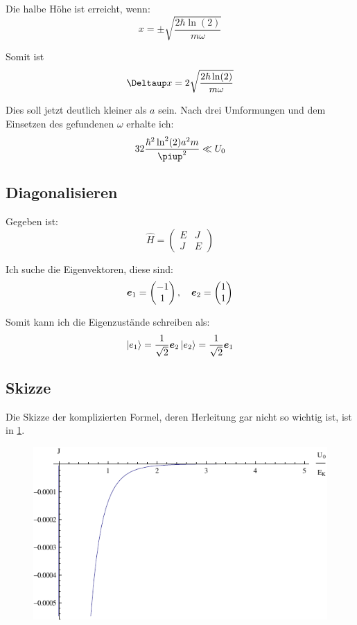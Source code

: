 Die halbe Höhe ist erreicht, wenn:
\[
	x = \pm \sqrt{\frac{2\hbar \ln(2)}{m\omega}}
\]

Somit ist
\[
	\Deltaup x = 2 \sqrt{\frac{2\hbar \ln(2)}{m\omega}}
\]

Dies soll jetzt deutlich kleiner als $a$ sein. Nach drei Umformungen und dem
Einsetzen des gefundenen $\omega$ erhalte ich:
\[
	32 \frac{\hbar^2 \ln^2(2) a^2 m}{\piup^2} \ll U_0
\]

\subsection{Diagonalisieren}

Gegeben ist:
\[
	\hat H = \begin{pmatrix}
		E & J \\ J & E
	\end{pmatrix}
\]

Ich suche die Eigenvektoren, diese sind:
\[
	\boldsymbol{e}_1 = \begin{pmatrix}
		-1 \\ 1
	\end{pmatrix}
	,\quad
	\boldsymbol{e}_2 = \begin{pmatrix}
		1 \\ 1
	\end{pmatrix}
\]

Somit kann ich die Eigenzustände schreiben als:
\[
	\left| e_1 \right\rangle = \frac{1}{\sqrt{2}} \boldsymbol{e}_2 \\
	\left| e_2 \right\rangle = \frac{1}{\sqrt{2}} \boldsymbol{e}_1 \\
\]

\subsection{Skizze}

Die Skizze der komplizierten Formel, deren Herleitung gar nicht so wichtig ist,
ist in \cref{fig:J}.

\begin{figure}
	\centering
	\includegraphics[width=\linewidth]{3d.pdf}
	\caption{}
	\label{fig:J}
\end{figure}

